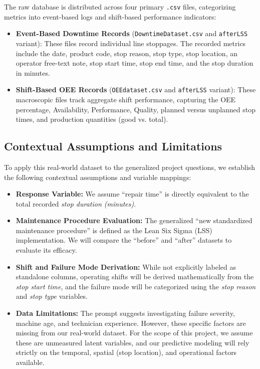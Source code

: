 The raw database is distributed across four primary \texttt{.csv} files, categorizing metrics into event-based logs and shift-based performance indicators:

\begin{itemize}
    \item \textbf{Event-Based Downtime Records} (\texttt{DowntimeDataset.csv} and \texttt{afterLSS} variant): These files record individual line stoppages. The recorded metrics include the date, product code, stop reason, stop type, stop location, an operator free-text note, stop start time, stop end time, and the stop duration in minutes.
    \item \textbf{Shift-Based OEE Records} (\texttt{OEEdataset.csv} and \texttt{afterLSS} variant): These macroscopic files track aggregate shift performance, capturing the OEE percentage, Availability, Performance, Quality, planned versus unplanned stop times, and production quantities (good vs. total).
\end{itemize}

\subsection{Contextual Assumptions and Limitations}
To apply this real-world dataset to the generalized project questions, we establish the following contextual assumptions and variable mappings:

\begin{itemize}
    \item \textbf{Response Variable:} We assume ``repair time'' is directly equivalent to the total recorded \textit{stop duration (minutes)}.
    \item \textbf{Maintenance Procedure Evaluation:} The generalized ``new standardized maintenance procedure'' is defined as the Lean Six Sigma (LSS) implementation. We will compare the ``before'' and ``after'' datasets to evaluate its efficacy.
    \item \textbf{Shift and Failure Mode Derivation:} While not explicitly labeled as standalone columns, operating shifts will be derived mathematically from the \textit{stop start time}, and the failure mode will be categorized using the \textit{stop reason} and \textit{stop type} variables.
    \item \textbf{Data Limitations:} The prompt suggests investigating failure severity, machine age, and technician experience. However, these specific factors are missing from our real-world dataset. For the scope of this project, we assume these are unmeasured latent variables, and our predictive modeling will rely strictly on the temporal, spatial (stop location), and operational factors available.
\end{itemize}